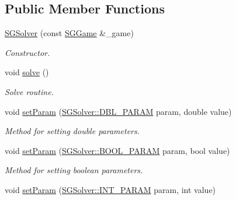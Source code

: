 \subsection*{Public Member Functions}
\begin{DoxyCompactItemize}
\item 
\hyperlink{class_s_g_solver_a12e82babf870b31f39857deabb8459c5}{S\+G\+Solver} (const \hyperlink{class_s_g_game}{S\+G\+Game} \&\+\_\+game)
\begin{DoxyCompactList}\small\item\em Constructor. \end{DoxyCompactList}\item 
void \hyperlink{class_s_g_solver_a220dd431eabdd9ff8419fafb28b7b990}{solve} ()
\begin{DoxyCompactList}\small\item\em Solve routine. \end{DoxyCompactList}\item 
\hypertarget{class_s_g_solver_a7810a9f3d48d3eb7220154274dd39053}{void \hyperlink{class_s_g_solver_a7810a9f3d48d3eb7220154274dd39053}{set\+Param} (\hyperlink{class_s_g_solver_a8c5a3d3ffb0b8344e24da63ea0b3e791}{S\+G\+Solver\+::\+D\+B\+L\+\_\+\+P\+A\+R\+A\+M} param, double value)}\label{class_s_g_solver_a7810a9f3d48d3eb7220154274dd39053}

\begin{DoxyCompactList}\small\item\em Method for setting double parameters. \end{DoxyCompactList}\item 
\hypertarget{class_s_g_solver_a5d1032f0224f8f531c26a9fade9f11b3}{void \hyperlink{class_s_g_solver_a5d1032f0224f8f531c26a9fade9f11b3}{set\+Param} (\hyperlink{class_s_g_solver_a8de18768065063c3641acbb1b3fcd844}{S\+G\+Solver\+::\+B\+O\+O\+L\+\_\+\+P\+A\+R\+A\+M} param, bool value)}\label{class_s_g_solver_a5d1032f0224f8f531c26a9fade9f11b3}

\begin{DoxyCompactList}\small\item\em Method for setting boolean parameters. \end{DoxyCompactList}\item 
\hypertarget{class_s_g_solver_adf7a7cbe92bb6f7d06575b802a7aaa43}{void \hyperlink{class_s_g_solver_adf7a7cbe92bb6f7d06575b802a7aaa43}{set\+Param} (\hyperlink{class_s_g_solver_a75381212963ce8fdcedd23bcff09d1fb}{S\+G\+Solver\+::\+I\+N\+T\+\_\+\+P\+A\+R\+A\+M} param, int value)}\label{class_s_g_solver_adf7a7cbe92bb6f7d06575b802a7aaa43}


\end{DoxyCompactItemize}
